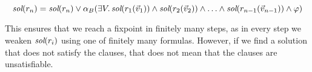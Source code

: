 \documentclass{amsart}
\theoremstyle{definition}
\theoremstyle{remark}
\numberwithin{equation}{section}
\begin{document}
$$\emph{sol}(r_n) = \emph{sol}(r_n) \lor
\alpha_B(\exists V \ldotp \emph{sol}(r_1(\vec{v}_1)) \land \emph{sol}(r_2(\vec{v}_2)) \land \ldots \land \emph{sol}(r_{n-1}(\vec{v}_{n-1}))
\land \varphi)$$

This ensures that we reach a fixpoint in finitely many steps,
as in every step we weaken $\emph{sol}(r_i)$ using one of finitely many formulas.
However, if we find a solution that does not satisfy the clauses,
that does not mean that the clauses are unsatisfiable.
\end{document}
